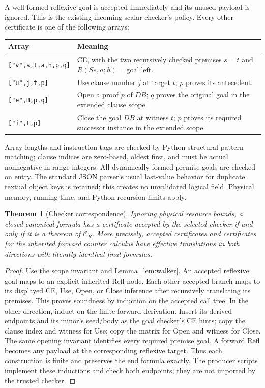 \documentclass[10pt,letterpaper]{article}
\newtheorem{theorem}{Theorem}[section]
\theoremstyle{definition}
\theoremstyle{remark}
\newcommand{\CR}{\mathcal C_R}
\begin{document}
A well-formed reflexive goal is accepted immediately and its unused
payload is ignored. This is the existing incoming scalar checker's
policy. Every other certificate is one of the following arrays:
\begin{center}
\small
\begin{tabularx}{\textwidth}{@{}lX@{}}
\toprule
Array & Meaning\\
\midrule
\texttt{["v",s,t,a,h,p,q]} &
CE, with the two recursively checked premises $s=t$ and
$R(Ss,a;h)=\text{goal.left}$.\\
\texttt{["u",j,t,p]} &
Use clause number $j$ at target $t$; $p$ proves its antecedent.\\
\texttt{["e",B,p,q]} &
Open a proof $p$ of $D B$; $q$ proves the original goal in the extended
clause scope.\\
\texttt{["i",t,p]} &
Close the goal $D B$ at witness $t$; $p$ proves its required successor
instance in the extended scope.\\
\bottomrule
\end{tabularx}
\end{center}
Array lengths and instruction tags are checked by Python structural
pattern matching; clause indices are zero-based, oldest first, and must be actual nonnegative
in-range integers. All dynamically formed premise goals are checked on entry.
The standard JSON parser's usual last-value behavior for duplicate textual
object keys is retained; this creates no unvalidated logical field.
Physical memory, running time, and Python recursion limits apply.

\begin{theorem}[Checker correspondence]\label{thm:checker}
Ignoring physical resource bounds, a closed canonical formula has a
certificate accepted by the selected checker if and only if it is a
theorem of $\CR$. More precisely, accepted certificates and certificates
for the inherited forward counter calculus have effective translations
in both directions with literally identical final formulas.
\end{theorem}
\begin{proof}
Use the scope invariant and Lemma~\ref{lem:walker}. An accepted reflexive
goal maps to an explicit inherited Refl node. Each other accepted
branch maps to its displayed CE, Use, Open, or Close inference after
recursively translating its premises. This proves soundness by induction
on the accepted call tree. In the other direction, induct on the finite
forward derivation. Insert its derived endpoints and its minor's seed/body
as the goal checker's CE hints; copy the clause index and witness for Use;
copy the matrix for Open and witness for Close. The same opening
invariant identifies every required premise goal. A forward Refl becomes
any payload at the corresponding reflexive target. Thus each construction
is finite and preserves the end formula exactly. The producer scripts
implement these inductions and check both endpoints; they are not imported
by the trusted checker.
\end{proof}
\end{document}
